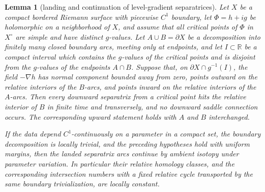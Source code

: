 \documentclass[reqno]{article}
\newtheorem{lem}[theorem]{Lemma}
\theoremstyle{definition}
\theoremstyle{remark}
\theoremstyle{plain}
\begin{document}
\begin{lem}[landing and continuation of level-gradient separatrices]\label{lem:gradient-landing}
Let $X$ be a compact bordered Riemann surface with piecewise $C^1$ boundary, let $\Phi=h+ig$ be holomorphic on a neighborhood of $X$, and assume that all critical points of $\Phi$ in $X^\circ$ are simple and have distinct $g$-values. Let $A\cup B=\partial X$ be a decomposition into finitely many closed boundary arcs, meeting only at endpoints, and let $I\subset\mathbb R$ be a compact interval which contains the $g$-values of the critical points and is disjoint from the $g$-values of the endpoints $A\cap B$. Suppose that, on $\partial X\cap g^{-1}(I)$, the field $-\nabla h$ has normal component bounded away from zero, points outward on the relative interiors of the $B$-arcs, and points inward on the relative interiors of the $A$-arcs. Then every downward separatrix from a critical point hits the relative interior of $B$ in finite time and transversely, and no downward saddle connection occurs. The corresponding upward statement holds with $A$ and $B$ interchanged.

If the data depend $C^1$-continuously on a parameter in a compact set, the boundary decomposition is locally trivial, and the preceding hypotheses hold with uniform margins, then the landed separatrix arcs continue by ambient isotopy under parameter variation. In particular their relative homology classes, and the corresponding intersection numbers with a fixed relative cycle transported by the same boundary trivialization, are locally constant.
\end{lem}
\end{document}
